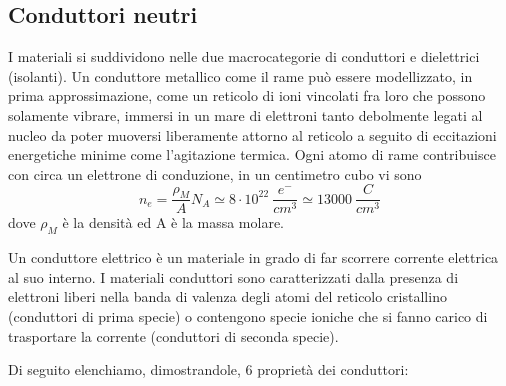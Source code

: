 \documentclass[
10pt, %
a4paper, %
oneside, %
headinclude,footinclude, %
BCOR5mm, %
]{scrartcl}
\begin{document}
\subsection{Conduttori neutri}
I materiali si suddividono nelle due macrocategorie di conduttori e dielettrici (isolanti). Un conduttore metallico come il rame può essere modellizzato, in prima approssimazione, come un reticolo di ioni vincolati fra loro che possono solamente vibrare, immersi in un mare di elettroni tanto debolmente legati al nucleo da poter muoversi liberamente attorno al reticolo a seguito di eccitazioni energetiche minime come l'agitazione termica. Ogni atomo di rame contribuisce con circa un elettrone di conduzione, in un centimetro cubo vi sono
\[n_e = \frac{\rho_M }{A}N_A \simeq 8\cdot 10^{22}\ \frac{e^-}{cm^3}\simeq13000\ \frac{C}{cm^3}\]
dove $\rho_M$ è la densità ed A è la massa molare.
\begin{definizione}
	Un conduttore elettrico è un materiale in grado di far scorrere corrente elettrica al suo interno. I materiali conduttori sono caratterizzati dalla presenza di elettroni liberi nella banda di valenza degli atomi del reticolo cristallino (conduttori di prima specie) o contengono specie ioniche che si fanno carico di trasportare la corrente (conduttori di seconda specie).
\end{definizione}
Di seguito elenchiamo, dimostrandole, 6 proprietà dei conduttori:
\end{document}

